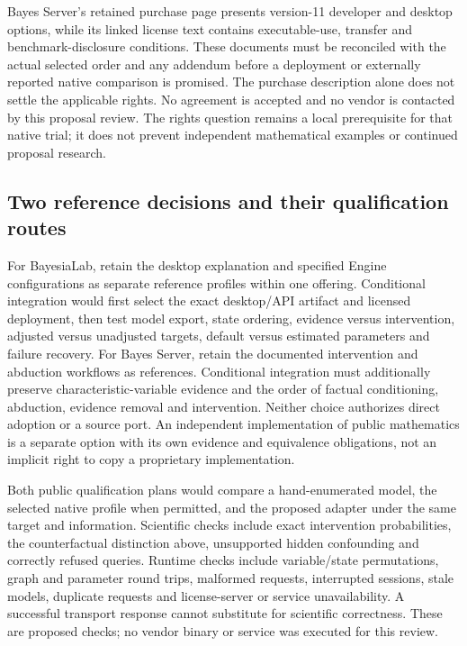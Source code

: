 Bayes Server's retained purchase page presents version-11 developer and
desktop options, while its linked license text contains executable-use,
transfer and benchmark-disclosure conditions. These documents must be
reconciled with the actual selected order and any addendum before a
deployment or externally reported native comparison is promised. The
purchase description alone does not settle the applicable rights. No
agreement is accepted and no vendor is contacted by this proposal review.
The rights question remains a local prerequisite for that native trial;
it does not prevent independent mathematical examples or continued
proposal research.~\citep{exec14_ci_purchase,exec14_ci_eula}

\subsection{Two reference decisions and their qualification routes}

For BayesiaLab, retain the desktop explanation and specified Engine
configurations as separate reference profiles within one offering.
Conditional integration would first select the exact desktop/API artifact
and licensed deployment, then test model export, state ordering, evidence
versus intervention, adjusted versus unadjusted targets, default versus
estimated parameters and failure recovery. For Bayes Server, retain the
documented intervention and abduction workflows as references. Conditional
integration must additionally preserve characteristic-variable evidence and
the order of factual conditioning, abduction, evidence removal and
intervention. Neither choice authorizes direct adoption or a source port.
An independent implementation of public mathematics is a separate option
with its own evidence and equivalence obligations, not an implicit right
to copy a proprietary implementation.~\citep{exec25_bn_commercial_choice}

Both public qualification plans would compare a hand-enumerated model, the
selected native profile when permitted, and the proposed adapter under the
same target and information. Scientific checks include exact intervention
probabilities, the counterfactual distinction above, unsupported hidden
confounding and correctly refused queries. Runtime checks include
variable/state permutations, graph and parameter round trips, malformed
requests, interrupted sessions, stale models, duplicate requests and
license-server or service unavailability. A successful transport response
cannot substitute for scientific correctness. These are proposed checks;
no vendor binary or service was executed for this review.
\citep{exec25_bn_commercial_choice}

